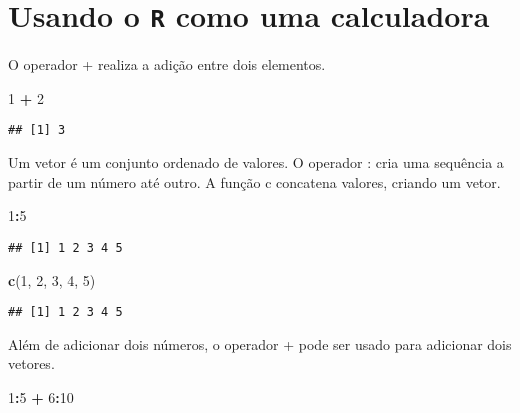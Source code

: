 \documentclass[]{book}
\newenvironment{Shaded}{\begin{snugshade}}{\end{snugshade}}
\newcommand{\DecValTok}[1]{\textcolor[rgb]{0.00,0.00,0.81}{#1}}
\newcommand{\KeywordTok}[1]{\textcolor[rgb]{0.13,0.29,0.53}{\textbf{#1}}}
\newcommand{\NormalTok}[1]{#1}
\newcommand{\OperatorTok}[1]{\textcolor[rgb]{0.81,0.36,0.00}{\textbf{#1}}}
\newcommand{\StringTok}[1]{\textcolor[rgb]{0.31,0.60,0.02}{#1}}
\theoremstyle{definition}
\theoremstyle{definition}
\theoremstyle{definition}
\theoremstyle{remark}
\begin{document}
\hypertarget{usando-o-r-como-uma-calculadora}{%
\section{\texorpdfstring{Usando o \texttt{R} como uma calculadora}{Usando o R como uma calculadora}}\label{usando-o-r-como-uma-calculadora}}

O operador + realiza a adição entre dois elementos.

\begin{Shaded}
\begin{Highlighting}[]
\DecValTok{1} \OperatorTok{+}\StringTok{ }\DecValTok{2}
\end{Highlighting}
\end{Shaded}

\begin{verbatim}
## [1] 3
\end{verbatim}

Um vetor é um conjunto ordenado de valores.
O operador : cria uma sequência a partir de um número até outro.
A função c concatena valores, criando um vetor.

\begin{Shaded}
\begin{Highlighting}[]
\DecValTok{1}\OperatorTok{:}\DecValTok{5}
\end{Highlighting}
\end{Shaded}

\begin{verbatim}
## [1] 1 2 3 4 5
\end{verbatim}

\begin{Shaded}
\begin{Highlighting}[]
\KeywordTok{c}\NormalTok{(}\DecValTok{1}\NormalTok{, }\DecValTok{2}\NormalTok{, }\DecValTok{3}\NormalTok{, }\DecValTok{4}\NormalTok{, }\DecValTok{5}\NormalTok{)}
\end{Highlighting}
\end{Shaded}

\begin{verbatim}
## [1] 1 2 3 4 5
\end{verbatim}

Além de adicionar dois números, o operador + pode ser usado para adicionar dois vetores.

\begin{Shaded}
\begin{Highlighting}[]
\DecValTok{1}\OperatorTok{:}\DecValTok{5} \OperatorTok{+}\StringTok{ }\DecValTok{6}\OperatorTok{:}\DecValTok{10}
\end{Highlighting}
\end{Shaded}
\end{document}

